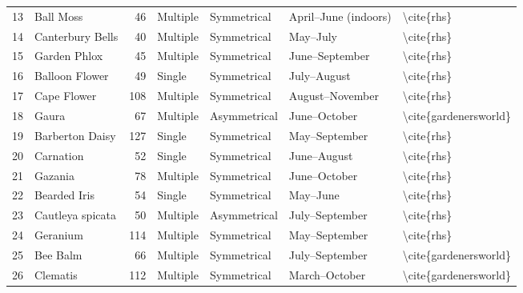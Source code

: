 \begin{table}
\begin{tabular}{rlrllll}
    13 &                 Ball Moss &           46 &    Multiple &  Symmetrical &     April–June (indoors) &              \textbackslash cite\{rhs\} \\
    14 &          Canterbury Bells &           40 &    Multiple &  Symmetrical &                 May–July &              \textbackslash cite\{rhs\} \\
    15 &              Garden Phlox &           45 &    Multiple &  Symmetrical &           June–September &              \textbackslash cite\{rhs\} \\
    16 &            Balloon Flower &           49 &      Single &  Symmetrical &              July–August &              \textbackslash cite\{rhs\} \\
    17 &               Cape Flower &          108 &    Multiple &  Symmetrical &          August–November &              \textbackslash cite\{rhs\} \\
    18 &                     Gaura &           67 &    Multiple & Asymmetrical &             June–October &   \textbackslash cite\{gardenersworld\} \\
    19 &           Barberton Daisy &          127 &      Single &  Symmetrical &            May–September &              \textbackslash cite\{rhs\} \\
    20 &                 Carnation &           52 &      Single &  Symmetrical &              June–August &              \textbackslash cite\{rhs\} \\
    21 &                   Gazania &           78 &    Multiple &  Symmetrical &             June–October &              \textbackslash cite\{rhs\} \\
    22 &              Bearded Iris &           54 &      Single &  Symmetrical &                 May–June &              \textbackslash cite\{rhs\} \\
    23 &          Cautleya spicata &           50 &    Multiple & Asymmetrical &           July–September &              \textbackslash cite\{rhs\} \\
    24 &                  Geranium &          114 &    Multiple &  Symmetrical &            May–September &              \textbackslash cite\{rhs\} \\
    25 &                  Bee Balm &           66 &    Multiple &  Symmetrical &           July–September &   \textbackslash cite\{gardenersworld\} \\
    26 &                  Clematis &          112 &    Multiple &  Symmetrical &            March–October &   \textbackslash cite\{gardenersworld\} \\

\end{tabular}
\end{table}
